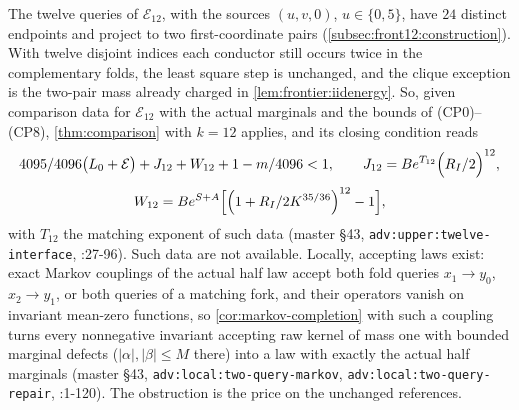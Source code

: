 The twelve queries of $\mathcal E_{12}$, with the sources $(u,v,0)$,
$u\in\{0,5\}$, have $24$ distinct endpoints and project to two first-coordinate
pairs (\cref{subsec:front12:construction}). With twelve disjoint indices each
conductor still occurs twice in the complementary folds, the least square step
is unchanged, and the clique exception is the two-pair mass already charged in \cref{lem:frontier:iidenergy}. So,
given comparison data for $\mathcal E_{12}$ with the actual marginals and the
bounds of (CP0)--(CP8), \cref{thm:comparison} with $k=12$ applies, and its closing
condition reads
\[
 \frac{4095}{4096}\bigl(L_0+\mathcal E\bigr)+J_{12}+W_{12}+\frac{1-m}{4096}<1,
 \qquad J_{12}=Be^{T_{12}}\Bigl(\frac{R_I}2\Bigr)^{12},
\]
\[
 W_{12}=Be^{S+A}\Bigl[\Bigl(1+\frac{R_I}{2\Kint^{35/36}}\Bigr)^{12}-1\Bigr],
\]
with $T_{12}$ the matching exponent of such data (master \S43,
\texttt{adv:upper:twelve-interface},
:27-96). Such data are not
available. Locally, accepting laws exist: exact Markov couplings of the actual
half law accept both fold queries $x_1\to y_0$, $x_2\to y_1$, or both queries of
a matching fork, and their operators vanish on invariant mean-zero functions, so
\cref{cor:markov-completion} with such a coupling turns every nonnegative
invariant accepting raw kernel of mass one with bounded marginal defects ($|\alpha|,|\beta|\le M$ there) into a
law with exactly the actual half marginals (master \S43,
\texttt{adv:local:two-query-markov}, \texttt{adv:local:two-query-repair},
:1-120). The
obstruction is the price on the unchanged references.

